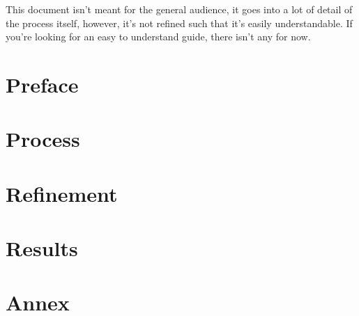 \documentclass{article}
\begin{document}
	This document isn't meant for the general audience, it goes into a lot of detail of the process itself, however, it's not refined such that it's easily understandable. If you're looking for an easy to understand guide, there isn't any for now.
\newpage
\part{Preface}


\newpage


\newpage
\part{Process}
		


\newpage

\newpage

\newpage


\newpage
\part{Refinement}


\newpage
\part{Results}


\newpage
{}
\part{Annex}

\end{document}
